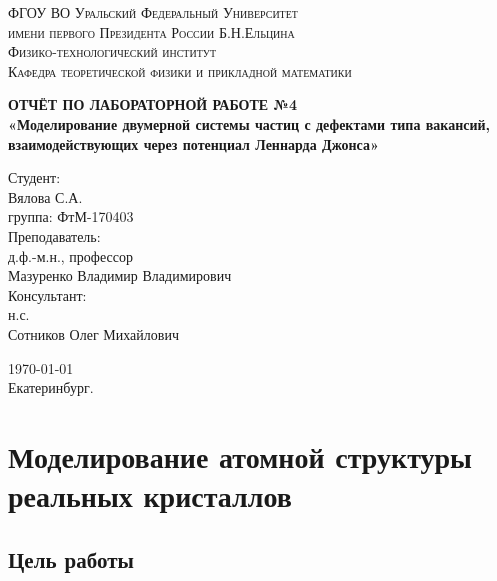 \documentclass[14pt,a4paper,report]{ncc}
\begin{document}
\def\contentsname{Содержание}

\begin{titlepage}
\begin{center}
\textsc{ФГОУ ВО Уральский Федеральный Университет \\ имени первого Президента России Б.Н.Ельцина\\[5mm]
Физико-технологический институт\\[2mm]
Кафедра теоретической физики и прикладной математики}

\vfill

\textbf{ОТЧЁТ ПО ЛАБОРАТОРНОЙ РАБОТЕ №4\\[3mm]
«Моделирование двумерной системы частиц с дефектами типа вакансий, взаимодействующих через потенциал Леннарда Джонса»\\[6mm]
}
\end{center}

\hfill
\begin{minipage}{.5\textwidth}
Студент:\\[2mm] 
Вялова С.А.\\
группа: ФтМ-170403 \\[5mm]

Преподаватель:\\[2mm] 
д.ф.-м.н., профессор\\
Мазуренко Владимир Владимирович\\[5mm]

Консультант:\\[2mm] 
н.с.\\
Сотников Олег Михайлович\\

\end{minipage}%
\vfill
\begin{center}
\today  \\
 Екатеринбург.
\end{center}
\end{titlepage}

\tableofcontents
\newpage
\chapter{Моделирование атомной структуры реальных кристаллов}
\section{Цель работы}
\end{document}
